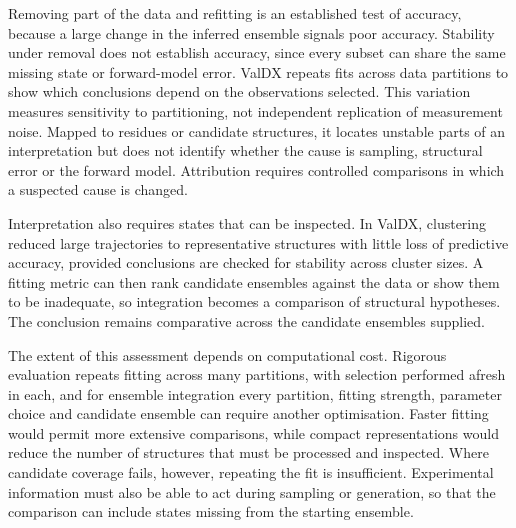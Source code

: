 Removing part of the data and refitting is an established test of accuracy, because a large change in the inferred ensemble signals poor accuracy.\supercite{bonomiPrinciplesProteinStructural2017} Stability under removal does not establish accuracy, since every subset can share the same missing state or forward-model error. ValDX repeats fits across data partitions to show which conclusions depend on the observations selected.\supercite{siddiquiFrameworkTestingStructural2026} This variation measures sensitivity to partitioning, not independent replication of measurement noise. Mapped to residues or candidate structures, it locates unstable parts of an interpretation but does not identify whether the cause is sampling, structural error or the forward model. Attribution requires controlled comparisons in which a suspected cause is changed.

Interpretation also requires states that can be inspected. In ValDX, clustering reduced large trajectories to representative structures with little loss of predictive accuracy,\supercite{siddiquiFrameworkTestingStructural2026} provided conclusions are checked for stability across cluster sizes. A fitting metric can then rank candidate ensembles against the data or show them to be inadequate,\supercite{bradshawInterpretationHDXData2020} so integration becomes a comparison of structural hypotheses. The conclusion remains comparative across the candidate ensembles supplied.

The extent of this assessment depends on computational cost. Rigorous evaluation repeats fitting across many partitions, with selection performed afresh in each,\supercite{cawleyOverfittingModelSelection2010} and for ensemble integration every partition, fitting strength, parameter choice and candidate ensemble can require another optimisation. Faster fitting would permit more extensive comparisons, while compact representations would reduce the number of structures that must be processed and inspected. Where candidate coverage fails, however, repeating the fit is insufficient. Experimental information must also be able to act during sampling or generation, so that the comparison can include states missing from the starting ensemble.

